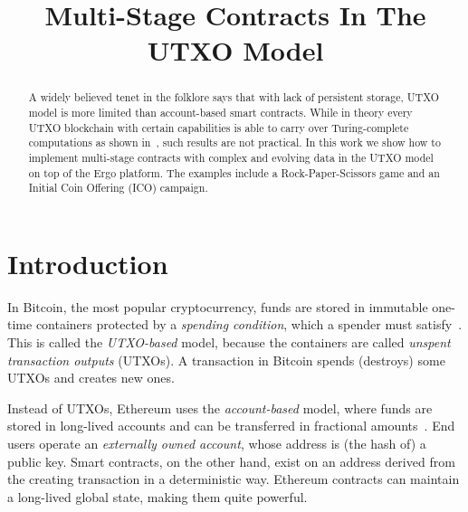 \documentclass[runningheads]{llncs}
\newcommand{\langname}{ErgoScript\xspace}
\begin{document}
\title{Multi-Stage Contracts In The UTXO Model}




\maketitle


\begin{abstract}
A widely believed tenet in the folklore says that with lack of persistent storage, UTXO model is more limited than account-based smart contracts. While in theory every UTXO blockchain with certain capabilities is able to carry over Turing-complete computations as shown in~\cite{CKM18a}, such results are not practical.
In this work we show how to implement multi-stage contracts with complex and evolving data in the UTXO model on top of the Ergo platform. The examples include a Rock-Paper-Scissors game and an Initial Coin Offering (ICO) campaign.
\end{abstract}

\section{Introduction}

In Bitcoin, the most popular cryptocurrency, funds are stored in immutable one-time containers protected by a {\em spending condition}, which a spender must satisfy~\cite{Nak08}.
This is called the {\em UTXO-based} model, because the containers are called {\em unspent transaction outputs} (UTXOs). 
A transaction in Bitcoin spends (destroys) some UTXOs and creates new ones. %

Instead of UTXOs, Ethereum
uses the {\em account-based} model, where funds are stored in long-lived accounts and can be transferred in fractional amounts~\cite{wood2014ethereum}. End users operate an {\em externally owned account}, whose address is (the hash of) a public key. Smart contracts, on the other hand, exist on an address derived from the creating transaction in a deterministic way. %
Ethereum contracts can maintain a long-lived global state, making them quite powerful. 
\end{document}
